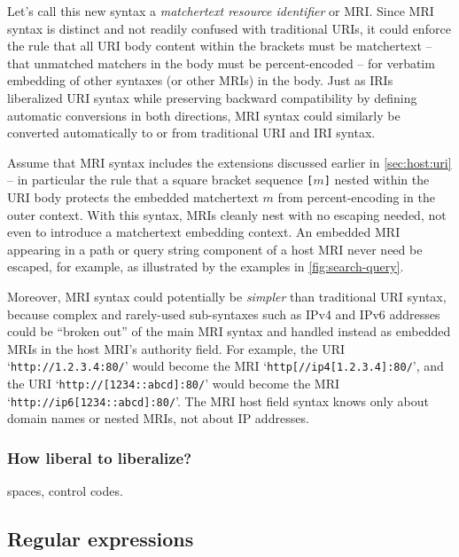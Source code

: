 Let's call this new syntax
a \emph{matchertext resource identifier} or MRI.
Since MRI syntax is distinct and not readily confused with traditional URIs,
it could enforce the rule that all URI body content within the brackets
must be matchertext --
\ie that unmatched matchers in the body must be percent-encoded --
for verbatim embedding of other syntaxes (or other MRIs) in the body.
Just as IRIs~\cite{rfc3987} liberalized URI syntax
while preserving backward compatibility
by defining automatic conversions in both directions,
MRI syntax could similarly be converted automatically
to or from traditional URI and IRI syntax.

Assume that MRI syntax includes the extensions
discussed earlier in \cref{sec:host:uri} --
in particular the rule that a square bracket sequence \verb|[|$m$\verb|]|
nested within the URI body protects the embedded matchertext $m$
from percent-encoding in the outer context.
With this syntax, MRIs cleanly nest with no escaping needed,
not even to introduce a matchertext embedding context.
An embedded MRI appearing in a path or query string component
of a host MRI never need be escaped, for example,
as illustrated by the examples in \cref{fig:search-query}.

Moreover, MRI syntax could potentially be \emph{simpler}
than traditional URI syntax,
because complex and rarely-used sub-syntaxes such as IPv4 and IPv6 addresses
could be ``broken out'' of the main MRI syntax
and handled instead as embedded MRIs in the host MRI's authority field.
For example,
the URI `\verb|http://1.2.3.4:80/|' would become
the MRI `\verb|http[//ip4[1.2.3.4]:80/|', and
the URI `\verb|http://[1234::abcd]:80/|' would become
the MRI `\verb|http://ip6[1234::abcd]:80/|'.
The MRI host field syntax knows only about domain names or nested MRIs,
not about IP addresses.


\subsubsection{How liberal to liberalize?}
\label{sec:embed:mri:liberal}

spaces, control codes.



\subsection{Regular expressions}

